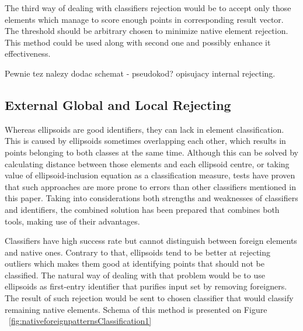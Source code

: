 \documentclass{llncs}
\begin{document}
The third way of dealing with classifiers rejection would be to accept only those elements which manage to score enough points in corresponding result vector. The threshold should be arbitrary chosen to minimize native element rejection. This method could be used along with second one and possibly enhance it effectiveness.

{\color{blue} Pewnie tez nalezy dodac schemat - pseudokod? opisujacy internal rejecting.}

\subsection{External Global and Local Rejecting}
  \label{subsec:GlobalLocalRejecting}

Whereas ellipsoids are good identifiers, they can lack in element classification. This is caused by ellipsoids sometimes overlapping each other, which results in points belonging to both classes at the same time. Although this can be solved by calculating distance between those elements and each ellipsoid centre, or taking value of ellipsoid-inclusion equation as a classification measure, tests have proven that such approaches are more prone to errors than other classifiers mentioned in this paper. Taking into considerations both strengths and weaknesses of classifiers and identifiers, the combined solution has been prepared that combines both tools, making use of their advantages.

Classifiers have high success rate but cannot distinguish between foreign elements and native ones. Contrary to that, ellipsoids tend to be better at rejecting outliers which makes them good at identifying points that should not be classified. The natural way of dealing with that problem would be to use ellipsoids as first-entry identifier that purifies input set by removing foreigners. The result of such rejection would be sent to chosen classifier that would classify remaining native elements. Schema of this method is presented on Figure ~\ref{fig:nativeforeignpatternsClassification1}
\end{document}
